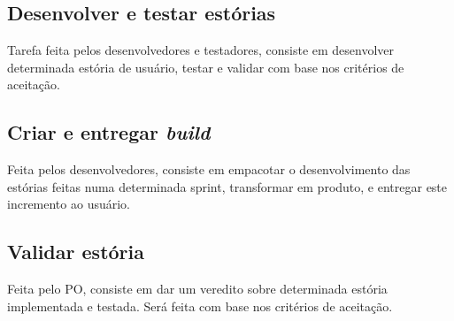 \subsection{Desenvolver e testar estórias}
Tarefa feita pelos desenvolvedores e testadores, consiste em desenvolver determinada estória de usuário, testar e validar com base nos critérios de aceitação.

\subsection{Criar e entregar \emph{build}}
Feita pelos desenvolvedores, consiste em empacotar o desenvolvimento das estórias feitas numa determinada sprint, transformar em produto, e entregar este incremento ao usuário.

\subsection{Validar estória}
Feita pelo PO, consiste em dar um veredito sobre determinada estória implementada e testada. Será feita com base nos critérios de aceitação.